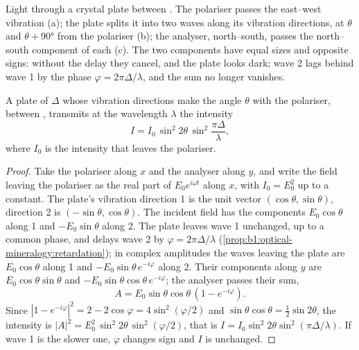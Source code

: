 \begin{omfigure}
{\small Light through a crystal plate between . The polariser
passes the east--west vibration (a); the plate splits it into two waves along
its vibration directions, at $\theta$ and $\theta + \ang{90}$ from the
polariser (b); the analyser, north--south, passes the north--south component of
each (c). The two components have equal sizes and opposite signs: without the
delay they cancel, and the plate looks dark; wave 2 lags behind wave 1 by the
phase $\varphi = 2\pi\Delta/\lambda$, and the sum no longer vanishes.}
\end{omfigure}

\begin{theorem}\label{thm:b1:optical-mineralogy:intensity}
A plate of  $\Delta$ whose vibration directions make the angle
$\theta$ with the polariser, between , transmits at the
wavelength $\lambda$ the intensity
\[
  I = I_0\,\sin^2 2\theta\,\sin^2\frac{\pi\Delta}{\lambda},
\]
where $I_0$ is the intensity that leaves the polariser.
\end{theorem}

\begin{proof}
Take the polariser along $x$ and the analyser along $y$, and write the field
leaving the polariser as the real part of $E_0 e^{i\omega t}$ along $x$, with
$I_0 = E_0^2$ up to a constant. The plate's vibration direction 1 is the unit
vector $(\cos\theta, \sin\theta)$, direction 2 is $(-\sin\theta, \cos\theta)$.
The incident field has the components $E_0\cos\theta$ along 1 and
$-E_0\sin\theta$ along 2. The plate leaves wave 1 unchanged, up to a common
phase, and delays wave 2 by $\varphi = 2\pi\Delta/\lambda$
(\cref{prop:b1:optical-mineralogy:retardation}); in complex amplitudes the
waves leaving the plate are $E_0\cos\theta$ along 1 and
$-E_0\sin\theta\,e^{-i\varphi}$ along 2. Their components along $y$ are
$E_0\cos\theta\sin\theta$ and $-E_0\sin\theta\cos\theta\,e^{-i\varphi}$; the
analyser passes their sum,
\[
  A = E_0\sin\theta\cos\theta\,(1 - e^{-i\varphi}) .
\]
Since $|1 - e^{-i\varphi}|^2 = 2 - 2\cos\varphi = 4\sin^2(\varphi/2)$ and
$\sin\theta\cos\theta = \frac12\sin2\theta$, the intensity is
$|A|^2 = E_0^2\,\sin^2 2\theta\,\sin^2(\varphi/2)$, that is
$I = I_0\sin^2 2\theta\sin^2(\pi\Delta/\lambda)$. If wave 1 is the slower one,
$\varphi$ changes sign and $I$ is unchanged.
\end{proof}


